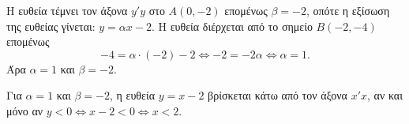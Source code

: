 
\begin{alist}
\item Η ευθεία τέμνει τον άξονα $y'y$ στο $A(0, -2)$ επομένως $\beta = -2$, οπότε η εξίσωση της
ευθείας γίνεται: $y = \alpha x - 2$. Η ευθεία διέρχεται από το σημείο $B(-2, -4)$ επομένως
\[-4 = \alpha \cdot (-2) - 2 \Leftrightarrow -2 = -2\alpha \Leftrightarrow \alpha = 1.\]
Άρα $\alpha = 1$ και $\beta = -2$.

\item Για $\alpha = 1$ και $\beta = -2$, η ευθεία $y = x - 2$ βρίσκεται κάτω από τον άξονα $x'x$, αν και
μόνο αν $y < 0 \Leftrightarrow x - 2 < 0 \Leftrightarrow x < 2$.
\end{alist}

